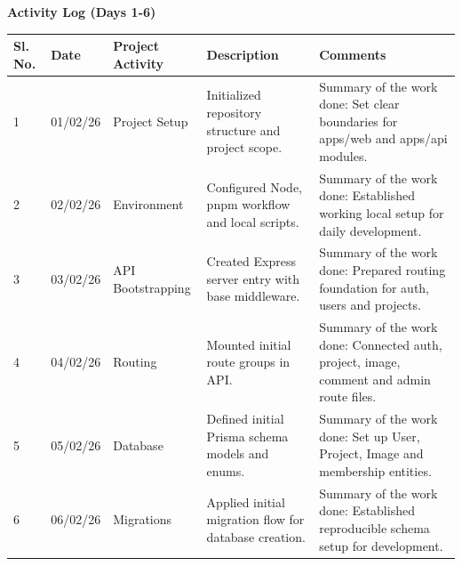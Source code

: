 \documentclass[12pt,a4paper]{article}
\begin{document}
\vspace{0.25cm}
\begin{center}{\large\bfseries Activity Log (Days 1-6)}\end{center}
\begin{tabular}{|p{}|p{}|p{}|p{}|p{}|}\hline
\centering\textbf{Sl. No.} & \centering\textbf{Date} & \centering\textbf{Project Activity} & \centering\textbf{Description} & \centering\textbf{Comments} \tabularnewline\hline
1 & 01/02/26 & Project Setup & Initialized repository structure and project scope. &
Summary of the work done:\newline
Set clear boundaries for apps/web and apps/api modules. \\ \hline
2 & 02/02/26 & Environment & Configured Node, pnpm workflow and local scripts. &
Summary of the work done:\newline
Established working local setup for daily development. \\ \hline
3 & 03/02/26 & API Bootstrapping & Created Express server entry with base middleware. &
Summary of the work done:\newline
Prepared routing foundation for auth, users and projects. \\ \hline
4 & 04/02/26 & Routing & Mounted initial route groups in API. &
Summary of the work done:\newline
Connected auth, project, image, comment and admin route files. \\ \hline
5 & 05/02/26 & Database & Defined initial Prisma schema models and enums. &
Summary of the work done:\newline
Set up User, Project, Image and membership entities. \\ \hline
6 & 06/02/26 & Migrations & Applied initial migration flow for database creation. &
Summary of the work done:\newline
Established reproducible schema setup for development. \\ \hline
\end{tabular}

\newpage
\end{document}
